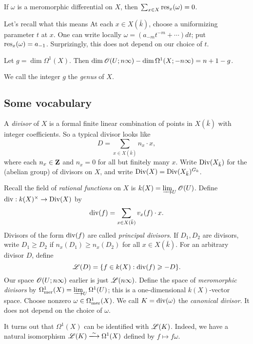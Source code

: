 \begin{theo}
If $\omega$ is a meromorphic differential on $X$, then 
$\sum_{x\in X} \operatorname{res}_x(\omega) = 0$. 
\end{theo}

Let's recall what this means At each $x\in X(\bar k)$, choose a 
uniformizing parameter $t$ at $x$. One can write locally 
$\omega = (a_{-m} t^{-m} + \cdots) dt$; put $\operatorname{res}_x(\omega) = a_{-1}$. 
Surprizingly, this does not depend on our choice of $t$. 

\begin{theo}
Let $g=\dim \Omega^1(X)$. Then 
$\dim \mathscr{O}(U;n\infty) - \dim\Omega^1(X;-n\infty) = n+1 - g$. 
\end{theo}

We call the integer $g$ the \emph{genus} of $X$. 





\subsection{Some vocabulary}

A \emph{divisor} of $X$ is a formal finite linear combination of points in 
$X(\bar k)$ with integer coefficients. So a typical divisor looks like 
\[
  D = \sum_{x\in X(\bar k)} n_x\cdot x ,
\]
where each $n_x\in \mathbf{Z}$ and $n_x=0$ for all but finitely many $x$. Write 
$\operatorname{Div}(X_{\bar k})$ for the (abelian group) of divisors on $X$, and 
write $\operatorname{Div}(X)=\operatorname{Div}(X_{\bar k})^{G_k}$. 

Recall the field of \emph{rational functions} on $X$ is 
$k(X)=\varinjlim_U \mathscr{O}(U)$. Define $\operatorname{div}:k(X)^\times \to \operatorname{Div}(X)$ 
by 
\[
  \operatorname{div}(f) = \sum_{x\in X(\bar k)} v_x(f)\cdot x .
\]
Divisors of the form $\operatorname{div}(f)$ are called \emph{principal divisors}. 
If $D_1,D_2$ are divisors, write $D_1\geqslant D_2$ if 
$n_x(D_1)\geqslant n_x(D_2)$ for all $x\in X(\bar k)$. For an arbitrary 
divisor $D$, define 
\[
  \mathscr{L}(D) = \{f\in k(X):\operatorname{div}(f)\geqslant - D\} .
\]
Our space $\mathscr{O}(U;n\infty)$ earlier is just $\mathscr{L}(n\infty)$. Define the space of 
\emph{meromorphic divisors} by 
$\Omega_{\mathrm{mer}}^1(X)=\varinjlim_U \Omega^1(U)$; this is a one-dimensional 
$k(X)$-vector space. Choose nonzero $\omega\in \Omega_{\mathrm{mer}}^1(X)$. We 
call $K=\operatorname{div}(\omega)$ the \emph{canonical divisor}. It does not depend on 
the choice of $\omega$. 

It turns out that $\Omega^1(X)$ can be identified with $\mathscr{L}(K)$. Indeed, 
we have a natural isomorphism $\sL(K) \iso \Omega^1(X)$ defined by 
$f\mapsto f\omega$. 

